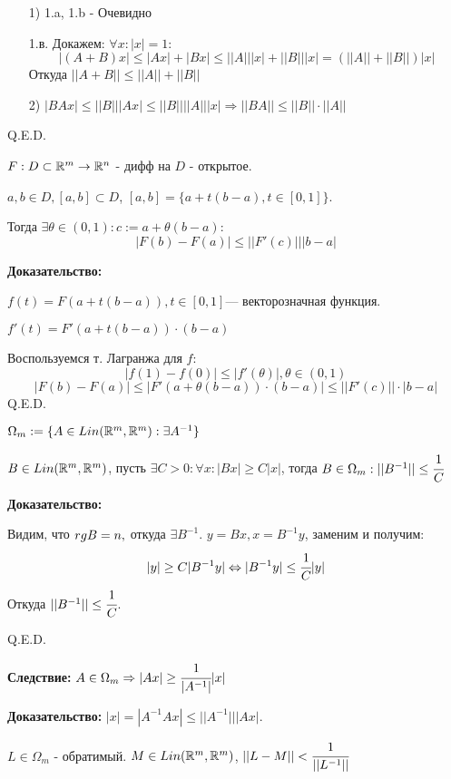 \begin{enumerate}
    \item[1)] 1.a, 1.b - Очевидно
    \item[] 1.в. Докажем: $\forall x: |x|= 1:$
    $$|(A+B)x|\leq |Ax| + |Bx| \leq ||A|| |x| + ||B|||x| = (||A||+||B||)|x|$$
    Откуда $||A+B|| \leq ||A||+ ||B||$
    \item[2)] $|BAx| \leq ||B|||Ax|\leq ||B||||A|||x| \Rightarrow ||BA||\leq ||B||\cdot||A||$
\end{enumerate}

\hfill Q.E.D.


$F:D \subset \mathbb{R}^m \rightarrow \mathbb{R}^n$ - дифф на $D$ - открытое.

$a,b \in D, [a,b] \subset D$, $[a,b] = \{a+ t(b-a), t\in[0,1]\}$.  

Тогда $\exists \theta \in (0,1): c:= a+\theta(b-a):$
$$|F(b)-F(a)|\leq ||F'(c)|||b-a|$$

\textbf{Доказательство:}

$f(t) = F(a  + t(b-a)), t\in[0,1]$--- векторозначная функция.

$f'(t) = F'(a+t(b-a))\cdot(b-a)$

Воспользуемся т. Лагранжа для $f:$
$$|f(1)-f(0)|\leq |f'(\theta)|, \theta \in (0,1)$$
$$|F(b)-F(a)|\leq |F'(a+ \theta (b-a))\cdot (b-a)|\leq ||F'(c)||\cdot |b-a|$$
\hfill Q.E.D.

 $\Omega_m := \{A \in Lin(\mathbb{R}^m, \mathbb{R}^m): \exists A^{-1}\}$



$B \in Lin(\mathbb{R}^m, \mathbb{R}^m)$, пусть $\exists C >0 : \forall x : |Bx|\geq C|x|$, тогда $B \in \Omega_m : ||B^{-1}|| \leq \cfrac{1}{C}$

\textbf{Доказательство:}

Видим, что $rg B = n,$ откуда $\exists B^{-1}$.  $y = Bx, x=B^{-1}y$,  заменим и получим:
$$|y| \geq  C |B^{-1}y|\Leftrightarrow |B^{-1}y|\leq\cfrac{1}{C}|y|$$
Откуда $||B^{-1}||\leq \cfrac{1}{C}$.

\hfill Q.E.D.

\textbf{Следствие:} $A \in \Omega_m \Rightarrow |Ax| \geq \cfrac{1}{|A^{-1}|}|x|$

\textbf{Доказательство:} $|x| = |A^{-1}Ax|\leq ||A^{-1}|||Ax|$.


$L \in \Omega_m$ - обратимый. $M\in Lin (\mathbb{R}^m, \mathbb{R}^m)$, $||L-M||< \cfrac{1}{||L^{-1}||}$ 

